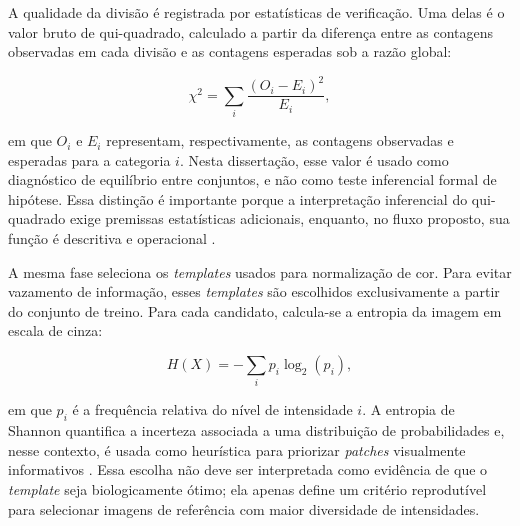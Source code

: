 A qualidade da divisão é registrada por estatísticas de verificação. Uma delas é
o valor bruto de qui-quadrado, calculado a partir da diferença entre as contagens
observadas em cada divisão e as contagens esperadas sob a razão global:

\begin{equation}
    \chi^2 =
    \sum_i \frac{(O_i-E_i)^2}{E_i},
    \label{eq:qui_quadrado}
\end{equation}

em que $O_i$ e $E_i$ representam, respectivamente, as contagens observadas e
esperadas para a categoria $i$. Nesta dissertação, esse valor é usado como
diagnóstico de equilíbrio entre conjuntos, e não como teste inferencial formal
de hipótese. Essa distinção é importante porque a interpretação inferencial do
qui-quadrado exige premissas estatísticas adicionais, enquanto, no fluxo
proposto, sua função é descritiva e operacional \cite{pearson1900criterion}.

A mesma fase seleciona os \textit{templates} usados para normalização de cor.
Para evitar vazamento de informação, esses \textit{templates} são escolhidos
exclusivamente a partir do conjunto de treino. Para cada candidato, calcula-se a
entropia da imagem em escala de cinza:

\begin{equation}
    H(X)=-\sum_i p_i\log_2(p_i),
    \label{eq:entropia}
\end{equation}

em que $p_i$ é a frequência relativa do nível de intensidade $i$. A entropia de
Shannon quantifica a incerteza associada a uma distribuição de probabilidades e,
nesse contexto, é usada como heurística para priorizar \textit{patches}
visualmente informativos \cite{shannon1948mathematical}. Essa escolha não deve
ser interpretada como evidência de que o \textit{template} seja biologicamente
ótimo; ela apenas define um critério reprodutível para selecionar imagens de
referência com maior diversidade de intensidades.

